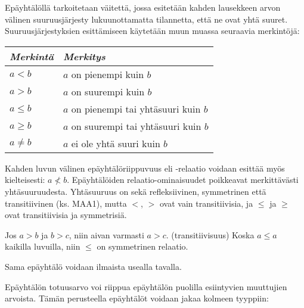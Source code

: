Epäyhtälöllä tarkoitetaan väitettä, jossa esitetään kahden lausekkeen arvon välinen suuruusjärjesty lukuunottamatta tilannetta, että ne ovat yhtä suuret. Suuruusjärjestyksien esittämiseen käytetään muun muassa seuraavia merkintöjä:

\begin{center}
\begin{tabular}{l|l}
\emph{Merkintä} & \emph{Merkitys} \\
\hline
$a<b$ &  $a$ on pienempi kuin $b$ \\
$a>b$ & $a$ on suurempi kuin $b$ \\
$a \leq b$ & $a$ on pienempi tai yhtäsuuri kuin $b$ \\
$a \geq b$ & $a$ on suurempi tai yhtäsuuri kuin $b$ \\
$a \neq b$ & $a$ ei ole yhtä suuri kuin $b$ \\
\end{tabular}
\end{center}

Kahden luvun välinen epäyhtälöriippuvuus eli -relaatio voidaan esittää myös kielteisesti: $a \nless b $. Epäyhtälöiden relaatio-ominaisuudet poikkeavat merkittävästi yhtäsuuruudesta. Yhtäsuuruus on sekä refleksiivinen, symmetrinen että transitiivinen (ks. MAA1), mutta $<$, $>$ ovat vain transitiivisia, ja $\leq$ ja $\geq$ ovat transitiivisia ja symmetrisiä.

\begin{esimerkki}
Jos $a>b$ ja $b>c$, niin aivan varmasti $a>c$. (transitiivisuus)
Koska $a \leq a$ kaikilla luvuilla, niin $\leq$ on symmetrinen relaatio.
\end{esimerkki}

Sama epäyhtälö voidaan ilmaista usealla tavalla.

\begin{esimerkki}
\end{esimerkki}

Epäyhtälön totuusarvo voi riippua epäyhtälön puolilla esiintyvien muuttujien arvoista. Tämän perusteella epäyhtälöt voidaan jakaa kolmeen tyyppiin:


